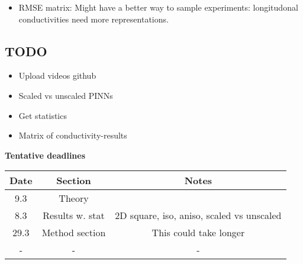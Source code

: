 \documentclass{article}
\begin{document}
\begin{itemize}
    \item RMSE matrix: Might have a better way to sample experiments: longitudonal conductivities need more representations.
\end{itemize}



\subsection{TODO}

\begin{itemize}
    \item Upload videos github
    \item Scaled vs unscaled PINNs
    \item Get statistics 
    \item Matrix of conductivity-results
    
     
\end{itemize}

\textbf{Tentative deadlines}\\
\begin{table}[h]
  \centering
  \begin{tabular}{|c|c|c|}
    \hline
    \textbf{Date} & \textbf{Section} & \textbf{Notes} \\ \hline
    9.3 & Theory &  \\ \hline
    8.3 & Results w. stat & 2D square, iso, aniso, scaled vs unscaled \\ \hline
    29.3& Method section  & This could take longer \\ \hline
    - & - & - \\ \hline
  \end{tabular}
\end{table}
\end{document}
